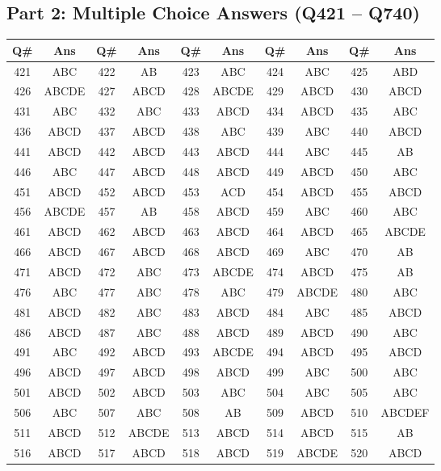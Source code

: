 \clearpage
\subsection*{Part 2: Multiple Choice Answers (Q421 -- Q740)}
\small
\begin{longtable}{cc|cc|cc|cc|cc}
\toprule
\textbf{Q\#} & \textbf{Ans} & \textbf{Q\#} & \textbf{Ans} & \textbf{Q\#} & \textbf{Ans} & \textbf{Q\#} & \textbf{Ans} & \textbf{Q\#} & \textbf{Ans} \\
\midrule
\endhead
421 & ABC & 422 & AB & 423 & ABC & 424 & ABC & 425 & ABD \\
426 & ABCDE & 427 & ABCD & 428 & ABCDE & 429 & ABCD & 430 & ABCD \\
431 & ABC & 432 & ABC & 433 & ABCD & 434 & ABCD & 435 & ABC \\
436 & ABCD & 437 & ABCD & 438 & ABC & 439 & ABC & 440 & ABCD \\
441 & ABCD & 442 & ABCD & 443 & ABCD & 444 & ABC & 445 & AB \\
446 & ABC & 447 & ABCD & 448 & ABCD & 449 & ABCD & 450 & ABC \\
451 & ABCD & 452 & ABCD & 453 & ACD & 454 & ABCD & 455 & ABCD \\
456 & ABCDE & 457 & AB & 458 & ABCD & 459 & ABC & 460 & ABC \\
461 & ABCD & 462 & ABCD & 463 & ABCD & 464 & ABCD & 465 & ABCDE \\
466 & ABCD & 467 & ABCD & 468 & ABCD & 469 & ABC & 470 & AB \\
471 & ABCD & 472 & ABC & 473 & ABCDE & 474 & ABCD & 475 & AB \\
476 & ABC & 477 & ABC & 478 & ABC & 479 & ABCDE & 480 & ABC \\
481 & ABCD & 482 & ABC & 483 & ABCD & 484 & ABC & 485 & ABCD \\
486 & ABCD & 487 & ABC & 488 & ABCD & 489 & ABCD & 490 & ABC \\
491 & ABC & 492 & ABCD & 493 & ABCDE & 494 & ABCD & 495 & ABCD \\
496 & ABCD & 497 & ABCD & 498 & ABCD & 499 & ABC & 500 & ABC \\
501 & ABCD & 502 & ABCD & 503 & ABC & 504 & ABC & 505 & ABC \\
506 & ABC & 507 & ABC & 508 & AB & 509 & ABCD & 510 & ABCDEF \\
511 & ABCD & 512 & ABCDE & 513 & ABCD & 514 & ABCD & 515 & AB \\
516 & ABCD & 517 & ABCD & 518 & ABCD & 519 & ABCDE & 520 & ABCD \\

\end{longtable}
